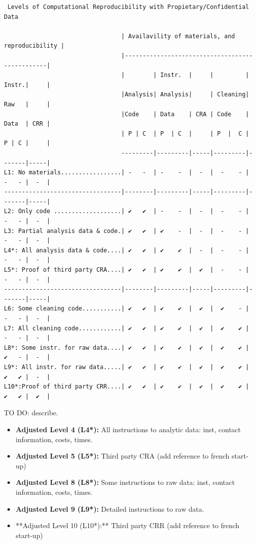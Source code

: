 \documentclass[]{book}
\begin{document}
\begin{verbatim}
 Levels of Computational Reproducibility with Propietary/Confidential Data    

                                 | Availavility of materials, and reproducibility |
                                 |------------------------------------------------|
                                 |        | Instr.  |     |         | Instr.|     |
                                 |Analysis| Analysis|     | Cleaning| Raw   |     |
                                 |Code    | Data    | CRA | Code    | Data  | CRR |
                                 | P | C  | P  | C  |     | P  |  C | P | C |     |
                                 ---------|---------|-----|---------|-------|-----|
L1: No materials.................| -   -  | -    -  |  -  |  -    - | -   - |  -  |
---------------------------------|--------|---------|-----|---------|-------|-----|
L2: Only code ...................| ✔   ✔  | -    -  |  -  |  -    - | -   - |  -  |
L3: Partial analysis data & code.| ✔   ✔  | ✔    -  |  -  |  -    - | -   - |  -  |
L4*: All analysis data & code....| ✔   ✔  | ✔    ✔  |  -  |  -    - | -   - |  -  |
L5*: Proof of third party CRA....| ✔   ✔  | ✔    ✔  |  ✔  |  -    - | -   - |  -  |
---------------------------------|--------|---------|-----|---------|-------|-----|
L6: Some cleaning code...........| ✔   ✔  | ✔    ✔  |  ✔  |  ✔    - | -   - |  -  |
L7: All cleaning code............| ✔   ✔  | ✔    ✔  |  ✔  |  ✔    ✔ | -   - |  -  |
L8*: Some instr. for raw data....| ✔   ✔  | ✔    ✔  |  ✔  |  ✔    ✔ | ✔   - |  -  |
L9*: All instr. for raw data.....| ✔   ✔  | ✔    ✔  |  ✔  |  ✔    ✔ | ✔   ✔ |  -  |
L10*:Proof of third party CRR....| ✔   ✔  | ✔    ✔  |  ✔  |  ✔    ✔ | ✔   ✔ |  ✔  |
\end{verbatim}

TO DO: describe.

\begin{itemize}
\item
  \textbf{Adjusted Level 4 (L4*):} All instructions to analytic data: inst, contact information, costs, times.
\item
  \textbf{Adjusted Level 5 (L5*):} Third party CRA (add reference to french start-up)
\item
  \textbf{Adjusted Level 8 (L8*):} Some instructions to raw data: inst, contact information, costs, times.
\item
  \textbf{Adjusted Level 9 (L9*):} Detailed instructions to raw data.
\item
  **Adjusted Level 10 (L10*):** Third party CRR (add reference to french start-up)
\end{itemize}
\end{document}
